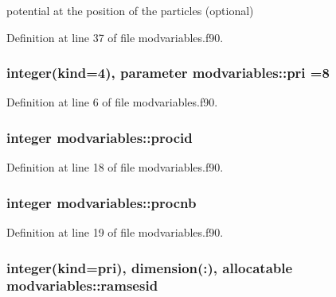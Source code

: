 potential at the position of the particles (optional) 



Definition at line 37 of file modvariables.\+f90.

\subsubsection[{\texorpdfstring{pri}{pri}}]{\setlength{\rightskip}{0pt plus 5cm}integer(kind=4), parameter modvariables\+::pri =8}\hypertarget{namespacemodvariables_a51e0b900e05f4302a36ddf33b6df0649}{}\label{namespacemodvariables_a51e0b900e05f4302a36ddf33b6df0649}


Definition at line 6 of file modvariables.\+f90.

\subsubsection[{\texorpdfstring{procid}{procid}}]{\setlength{\rightskip}{0pt plus 5cm}integer modvariables\+::procid}\hypertarget{namespacemodvariables_a27cda3ac7f6a8948a5f95e7dfa724167}{}\label{namespacemodvariables_a27cda3ac7f6a8948a5f95e7dfa724167}


Definition at line 18 of file modvariables.\+f90.

\subsubsection[{\texorpdfstring{procnb}{procnb}}]{\setlength{\rightskip}{0pt plus 5cm}integer modvariables\+::procnb}\hypertarget{namespacemodvariables_ae51b502acd90a80a0134e81f92fbac15}{}\label{namespacemodvariables_ae51b502acd90a80a0134e81f92fbac15}


Definition at line 19 of file modvariables.\+f90.

\subsubsection[{\texorpdfstring{ramsesid}{ramsesid}}]{\setlength{\rightskip}{0pt plus 5cm}integer(kind={\bf pri}), dimension(\+:), allocatable modvariables\+::ramsesid}\hypertarget{namespacemodvariables_ae6b45a68a4cbf0ccbbf7c08ee87e3573}{}\label{namespacemodvariables_ae6b45a68a4cbf0ccbbf7c08ee87e3573}


